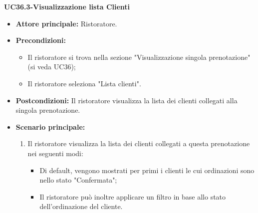 \textbf{UC36.3-Visualizzazione lista Clienti}
\begin{itemize}
    \item \textbf{Attore principale:} Ristoratore.
    \item \textbf{Precondizioni:}
    \begin{itemize}
        \item Il ristoratore si trova nella sezione "Visualizzazione singola prenotazione" (si veda UC36);
        \item Il ristoratore seleziona "Lista clienti".
    \end{itemize}
    \item \textbf{Postcondizioni:} Il ristoratore visualizza la lista dei clienti collegati alla singola prenotazione.
    \item \textbf{Scenario principale:}
    \begin{enumerate}
        \item Il ristoratore visualizza la lista dei clienti collegati a questa prenotazione nei seguenti modi:
        \begin{itemize}
            \item Di default, vengono mostrati per primi i clienti le cui ordinazioni sono nello stato "Confermata";
            \item Il ristoratore può inoltre applicare un filtro in base allo stato dell'ordinazione del cliente.
        \end{itemize}
    \end{enumerate}
\end{itemize}

